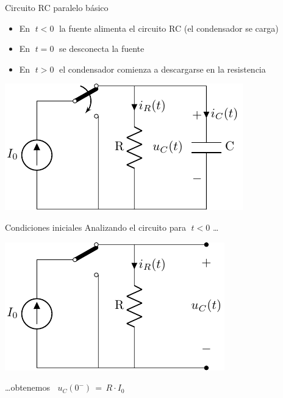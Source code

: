 \documentclass[aspectratio=169, usenames,svgnames,dvipsnames]{beamer}
\begin{document}
\begin{frame}{Circuito RC paralelo básico}
    \vspace{1mm}
    \begin{itemize}
        \item En \(\; t < 0 \;\) la fuente alimenta el circuito RC (el condensador se carga)
        \item En \(\; t = 0 \;\) se desconecta la fuente
        \item En \(\; t > 0 \;\) el condensador comienza a descargarse en la resistencia
    \end{itemize}
    
    \begin{center}
        \includegraphics[height=0.47\textheight]{../figs/transitorio_circuitoRC.pdf}
    \end{center}
\end{frame}


\begin{frame}{Condiciones iniciales} \label{diapo:CondicionInicialRC}
    Analizando el circuito para \(\; t < 0\) \ldots{}
    \begin{center}
        \includegraphics[height=0.47\textheight]{../figs/transitorio_circuitoRC_t0-.pdf}
    \end{center}
    \ldots{}obtenemos \( \;\boxed{\; u_C(0^-) \,=\, R \cdot I_0 \;}\)
\end{frame}
\end{document}
